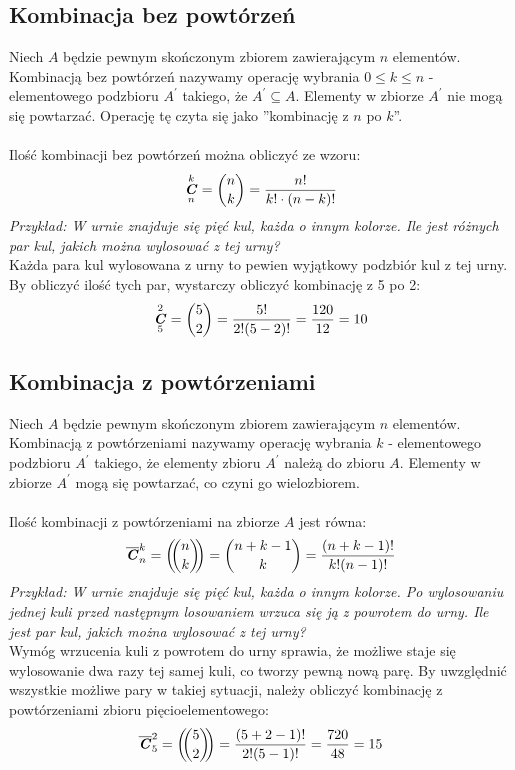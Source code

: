 \documentclass[14pt,a4paper]{extarticle}
\DeclareMathOperator{\varcomb}{\textbf{\textit{C}}}
\begin{document}
\subsection*{Kombinacja bez powtórzeń}
\noindent Niech $A$ będzie pewnym skończonym zbiorem zawierającym $n$ elementów.
Kombinacją bez powtórzeń nazywamy operację wybrania $0 \leq k \leq n$ - elementowego podzbioru $A^{\prime}$ takiego, że
$A^{\prime} \subseteq A$. Elementy w zbiorze $A^{\prime}$ nie mogą się powtarzać. Operację tę czyta się jako ''kombinację z $n$ po $k$''.\\\\
Ilość kombinacji bez powtórzeń można obliczyć ze wzoru:
\[\varcomb^{k}_{n} = \dbinom{n}{k} = \dfrac{n!}{k!\cdot (n-k)!}\]
\noindent\textit{Przykład: W urnie znajduje się pięć kul, każda o innym kolorze. Ile jest różnych
par kul, jakich można wylosować z tej urny?}\\
\noindent Każda para kul wylosowana z urny to pewien wyjątkowy podzbiór kul z tej urny. By obliczyć
ilość tych par, wystarczy obliczyć kombinację z 5 po 2:
\[\varcomb^{2}_{5} = \dbinom{5}{2} = \dfrac{5!}{2!(5-2)!} = \dfrac{120}{12}=10\]


\subsection*{Kombinacja z powtórzeniami}
\noindent Niech $A$ będzie pewnym skończonym zbiorem zawierającym $n$ elementów.
Kombinacją z powtórzeniami nazywamy operację wybrania $k$ - elementowego podzbioru $A^{\prime}$ takiego,
 że elementy zbioru $A^{\prime}$ należą do zbioru $A$. 
Elementy w zbiorze $A^{\prime}$ mogą się powtarzać, co czyni go wielozbiorem.\\\\
Ilość kombinacji z powtórzeniami na zbiorze $A$
jest równa:
\[\overline{\varcomb}^{k}_{n} = \left(\!\!\dbinom{n}{k}\!\!\right) = \dbinom{n+k-1}{k} = \dfrac{(n+k-1)!}{k!(n-1)!}\]
\noindent\textit{Przykład: W urnie znajduje się pięć kul, każda o innym kolorze. Po wylosowaniu jednej kuli przed
następnym losowaniem wrzuca się ją z powrotem do urny. Ile jest par kul, jakich można 
wylosować z tej urny?}\\
Wymóg wrzucenia kuli z powrotem do urny sprawia, że możliwe staje się wylosowanie dwa razy tej
samej kuli, co tworzy pewną nową parę. By uwzględnić wszystkie możliwe pary w takiej sytuacji,
należy obliczyć kombinację z powtórzeniami zbioru pięcioelementowego:
\[\overline{\varcomb}^{2}_{5} = \left(\!\!\dbinom{5}{2}\!\!\right) = \dfrac{(5+2-1)!}{2!(5-1)!} = \dfrac{720}{48} = 15\]
\end{document}
